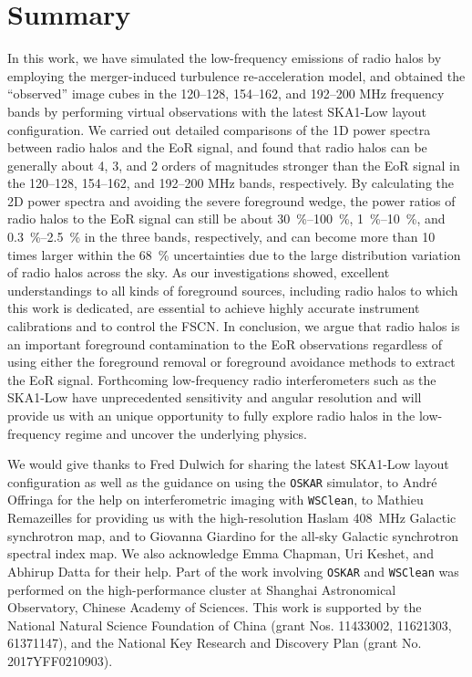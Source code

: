\documentclass[modern]{aastex62}
\begin{document}
\section{Summary}
\label{sec:summary}

{\color{cyan}%
In this work, we have simulated the low-frequency emissions of radio
halos by employing the merger-induced turbulence re-acceleration model,
and obtained the \enquote{observed} image cubes in the
\numrange{120}{128}, \numrange{154}{162}, and \numrange{192}{200}
\si{\MHz} frequency bands by performing virtual observations with the
latest SKA1-Low layout configuration.
We carried out detailed comparisons of the 1D power spectra between
radio halos and the EoR signal, and found that radio halos can be
generally about 4, 3, and 2 orders of magnitudes stronger than the EoR
signal in the \numrange{120}{128}, \numrange{154}{162}, and
\numrange{192}{200} \si{\MHz} bands, respectively.
By calculating the 2D power spectra and avoiding the severe foreground
wedge, the power ratios of radio halos to the EoR signal can still be
about \SIrange[range-units=repeat]{30}{100}{\percent},
\SIrange[range-units=repeat]{1}{10}{\percent}, and
\SIrange[range-units=repeat]{0.3}{2.5}{\percent}
in the three bands, respectively,
and can become more than 10 times larger within the \SI{68}{\percent}
uncertainties due to the large distribution variation of radio halos
across the sky.
As our investigations showed, excellent understandings to all kinds of
foreground sources, including radio halos to which this work is dedicated,
are essential to achieve highly accurate instrument calibrations and
to control the FSCN.
In conclusion, we argue that radio halos is an important foreground
contamination to the EoR observations regardless of using either the
foreground removal or foreground avoidance methods to extract the EoR
signal.
Forthcoming low-frequency radio interferometers such as the SKA1-Low
have unprecedented sensitivity and angular resolution and will provide
us with an unique opportunity to fully explore radio halos in the
low-frequency regime and uncover the underlying physics.
} %


\acknowledgments

We would give thanks
to Fred Dulwich for sharing the latest SKA1-Low layout configuration as
well as the guidance on using the \texttt{OSKAR} simulator,
to Andr\'e Offringa for the help on interferometric imaging with
\texttt{WSClean},
to Mathieu Remazeilles for providing us with the high-resolution Haslam
\SI{408}{\MHz} Galactic synchrotron map,
and to Giovanna Giardino for the all-sky Galactic synchrotron spectral
index map.
We also acknowledge Emma Chapman, Uri Keshet, and Abhirup Datta for
their help.
Part of the work involving \texttt{OSKAR} and \texttt{WSClean} was
performed on the high-performance cluster at Shanghai Astronomical
Observatory, Chinese Academy of Sciences.
This work is supported by the National Natural Science Foundation of China
(grant Nos. 11433002, 11621303, 61371147),
and the National Key Research and Discovery Plan (grant No. 2017YFF0210903).
\end{document}
